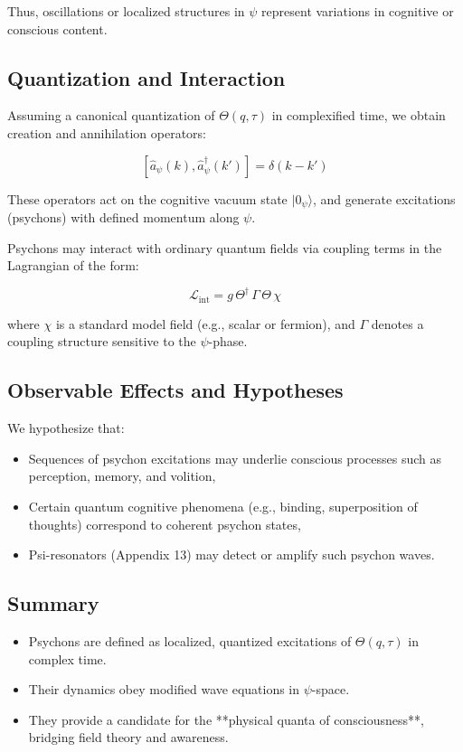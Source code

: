 Thus, oscillations or localized structures in \(\psi\) represent variations in cognitive or conscious content.

\subsection*{Quantization and Interaction}

Assuming a canonical quantization of \(\Theta(q, \tau)\) in complexified time, we obtain creation and annihilation operators:

\[
[\hat{a}_{\psi}(k), \hat{a}_{\psi}^\dagger(k')] = \delta(k - k')
\]

These operators act on the cognitive vacuum state \(|0_\psi\rangle\), and generate excitations (psychons) with defined
momentum along \(\psi\).

Psychons may interact with ordinary quantum fields via coupling terms in the Lagrangian of the form:

\[
\mathcal{L}_{\text{int}} = g \, \Theta^\dagger \, \Gamma \, \Theta \, \chi
\]

where \(\chi\) is a standard model field (e.g., scalar or fermion), and \(\Gamma\) denotes a coupling structure sensitive
to the \(\psi\)-phase.

\subsection*{Observable Effects and Hypotheses}

We hypothesize that:
\begin{itemize}
  \item Sequences of psychon excitations may underlie conscious processes such as perception, memory, and volition,
  \item Certain quantum cognitive phenomena (e.g., binding, superposition of thoughts) correspond to coherent psychon states,
  \item Psi-resonators (Appendix 13) may detect or amplify such psychon waves.
\end{itemize}

\subsection*{Summary}

\begin{itemize}
  \item Psychons are defined as localized, quantized excitations of \(\Theta(q, \tau)\) in complex time.
  \item Their dynamics obey modified wave equations in \(\psi\)-space.
  \item They provide a candidate for the **physical quanta of consciousness**, bridging field theory and awareness.
\end{itemize}
